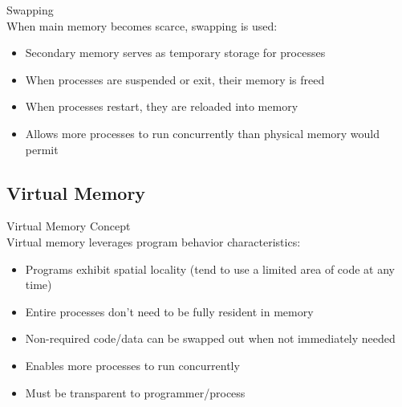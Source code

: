 \begin{definition}{Swapping}\\
    When main memory becomes scarce, swapping is used:
    \begin{itemize}
        \item Secondary memory serves as temporary storage for processes
        \item When processes are suspended or exit, their memory is freed
        \item When processes restart, they are reloaded into memory
        \item Allows more processes to run concurrently than physical memory would permit
    \end{itemize}
\end{definition}

\subsection{Virtual Memory}

\begin{definition}{Virtual Memory Concept}\\
    Virtual memory leverages program behavior characteristics:
    \begin{itemize}
        \item Programs exhibit spatial locality (tend to use a limited area of code at any time)
        \item Entire processes don't need to be fully resident in memory
        \item Non-required code/data can be swapped out when not immediately needed
        \item Enables more processes to run concurrently
        \item Must be transparent to programmer/process
    \end{itemize}
\end{definition}

